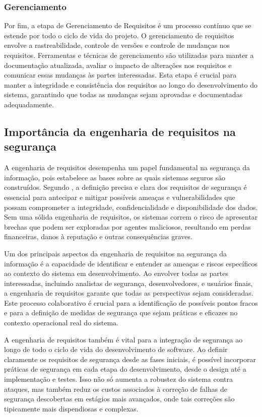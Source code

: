     \subsubsection{Gerenciamento}
    Por fim, a etapa de Gerenciamento de Requisitos é um processo contínuo que se estende por todo o ciclo de vida do projeto. O gerenciamento de requisitos envolve a rastreabilidade, controle de versões e controle de mudanças nos requisitos. Ferramentas e técnicas de gerenciamento são utilizadas para manter a documentação atualizada, avaliar o impacto de alterações nos requisitos e comunicar essas mudanças às partes interessadas. Esta etapa é crucial para manter a integridade e consistência dos requisitos ao longo do desenvolvimento do sistema, garantindo que todas as mudanças sejam aprovadas e documentadas adequadamente.
    
    
    \subsection{Importância da engenharia de requisitos na segurança}

    A engenharia de requisitos desempenha um papel fundamental na segurança da informação, pois estabelece as bases sobre as quais sistemas seguros são construídos. Segundo  , a definição precisa e clara dos requisitos de segurança é essencial para antecipar e mitigar possíveis ameaças e vulnerabilidades que possam comprometer a integridade, confidencialidade e disponibilidade dos dados. Sem uma sólida engenharia de requisitos, os sistemas correm o risco de apresentar brechas que podem ser exploradas por agentes maliciosos, resultando em perdas financeiras, danos à reputação e outras consequências graves.

    Um dos principais aspectos da engenharia de requisitos na segurança da informação é a capacidade de identificar e entender as ameaças e riscos específicos ao contexto do sistema em desenvolvimento. Ao envolver todas as partes interessadas, incluindo analistas de segurança, desenvolvedores, e usuários finais, a engenharia de requisitos garante que todas as perspectivas sejam consideradas. Este processo colaborativo é crucial para a identificação de possíveis pontos fracos e para a definição de medidas de segurança que sejam práticas e eficazes no contexto operacional real do sistema.
    
    A engenharia de requisitos também é vital para a integração de segurança ao longo de todo o ciclo de vida do desenvolvimento de software. Ao definir claramente os requisitos de segurança desde as fases iniciais, é possível incorporar práticas de segurança em cada etapa do desenvolvimento, desde o design até a implementação e testes. Isso não só aumenta a robustez do sistema contra ataques, mas também reduz os custos associados à correção de falhas de segurança descobertas em estágios mais avançados, onde tais correções são tipicamente mais dispendiosas e complexas.
    

